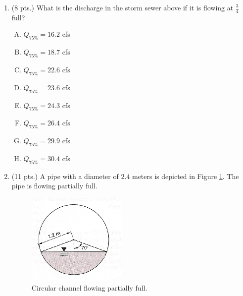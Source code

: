 \documentclass[11pt]{article}
\begin{document}
\begin{enumerate}
\clearpage
\item (8 pts.)
What is the discharge in the storm sewer above if it is flowing at $\frac{3}{4}$ full?
\begin{enumerate} [(A)]
\item  $Q_{75\%} = 16.2 $ cfs
\item  $Q_{75\%} = 18.7$ cfs
\item  $Q_{75\%} = 22.6$ cfs
\item  $Q_{75\%} = 23.6$ cfs
\item $Q_{75\%} = 24.3$ cfs
\item $Q_{75\%} = 26.4$ cfs
\item $Q_{75\%} = 29.9$ cfs
\item $Q_{75\%} = 30.4$ cfs
\end{enumerate}
\item  (11 pts.)
A pipe with a diameter of $2.4$ meters is depicted in Figure \ref{fig:CircularSewerToo}.   The pipe is flowing partially full.

\begin{figure}[h!] %
\centering
   \includegraphics[width=1.9in]{CircularSewerToo.jpg}
   \caption{Circular channel flowing partially full.}
   \label{fig:CircularSewerToo} 
\end{figure}


\end{enumerate}
\end{document}

